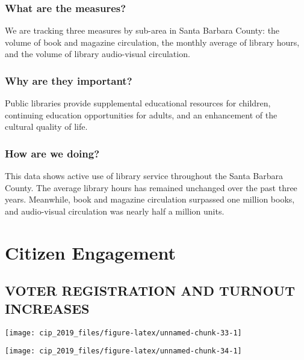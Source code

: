 \documentclass[]{book}
\theoremstyle{definition}
\theoremstyle{definition}
\theoremstyle{definition}
\theoremstyle{remark}
\begin{document}
\subsubsection*{What are the measures?}\label{what-are-the-measures-3}

We are tracking three measures by sub-area in Santa Barbara County: the
volume of book and magazine circulation, the monthly average of library
hours, and the volume of library audio-visual circulation.

\subsubsection*{Why are they important?}\label{why-are-they-important-2}

Public libraries provide supplemental educational resources for
children, continuing education opportunities for adults, and an
enhancement of the cultural quality of life.

\subsubsection*{How are we doing?}\label{how-are-we-doing-19}

This data shows active use of library service throughout the Santa
Barbara County. The average library hours has remained unchanged over
the past three years. Meanwhile, book and magazine circulation surpassed
one million books, and audio-visual circulation was nearly half a
million units.

\section*{Citizen Engagement}\label{citizen-engagement}

\subsection*{VOTER REGISTRATION AND TURNOUT
INCREASES}\label{voter-registration-and-turnout-increases}

\texttt{[image: cip\_2019\_files/figure-latex/unnamed-chunk-33-1]}

\texttt{[image: cip\_2019\_files/figure-latex/unnamed-chunk-34-1]}
\end{document}
